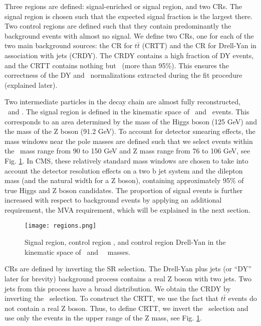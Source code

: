 Three regions are defined: signal-enriched or signal region, and two CRs. The signal region is chosen such that the expected signal fraction is the largest there. Two control regions are defined such that they contain predominantly the background events with almost no signal. We define two CRs, one for each of the two main background sources: the CR for $t\bar{t}$ (CRTT) and the CR for Drell-Yan in association with jets (CRDY). The CRDY contains a high fraction of DY events, and the CRTT contains nothing but \ttbar~(more than 95\%). This ensures the correctness of the DY and \ttbar~normalizations extracted during the fit procedure (explained later).

Two intermediate particles in the decay chain are almost fully reconstructed, \HBB~and \Zll. The signal region is defined in the kinematic space of \HBB~and \Zll~events. This corresponds to an area determined by the mass of the Higgs boson (125 GeV) and the mass of the Z boson (91.2 GeV). To account for detector smearing effects, the mass windows near the pole masses are defined such that we select events within the \HBB~mass range from 90 to 150 GeV and Z mass range from 76 to 106 GeV, see Fig. \ref{fig:regions}. In  CMS, these relatively standard mass windows are chosen to take into account the detector resolution effects on a two b jet system and the dilepton mass (and the natural width for a Z boson), containing approximately 95$\%$ of true Higgs and Z boson candidates. The proportion of signal events is further increased with respect to background events by applying an additional requirement, the MVA requirement, which will be explained in the next section.

\begin{figure}[!htb]%
\begin{center}
\texttt{[image: regions.png]}
\caption[Analysis phase space with the signal and two control regions.]{ Signal region, control region \ttbar, and control region Drell-Yan in the kinematic space of \ZtoLL ~and ~\HBB~masses. }
\label{fig:regions}
\end{center}
\end{figure}

CRs are defined by inverting the SR selection. The Drell-Yan plus jets (or ``DY'' later for brevity) background process contains a real Z boson with two jets. Two jets from this process have a broad distribution. We obtain the CRDY by inverting the \HBB~selection. To construct the CRTT, we use the fact that $t\bar{t}$ events do not contain a real Z boson. Thus, to define CRTT, we invert the \Zll~selection and use only the events in the upper range of the Z mass, see Fig. \ref{fig:regions}. 

